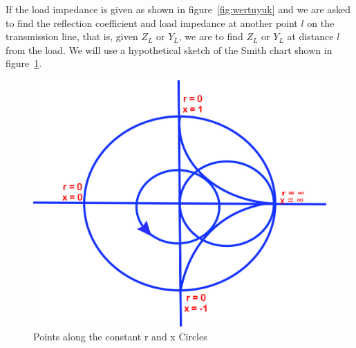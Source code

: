 If the load impedance is given as shown in figure~\ref{fig:wertuyuk} and we are asked to find the reflection coefficient and load impedance at another point $l$ on the transmission line, that is, given $Z_L$ or $Y_L$, we are to find $Z_L$ or $Y_L$ at distance $l$ from the load. We will use a hypothetical sketch of the Smith chart shown in figure~\ref{fig:uytrewsxcvbj}.
\begin{figure}[h]
\centering
\includegraphics[width=0.9\linewidth]{graphics/uytrewsxcvbj}
\caption{Points along the constant r and x Circles}
\label{fig:uytrewsxcvbj}
\end{figure}

